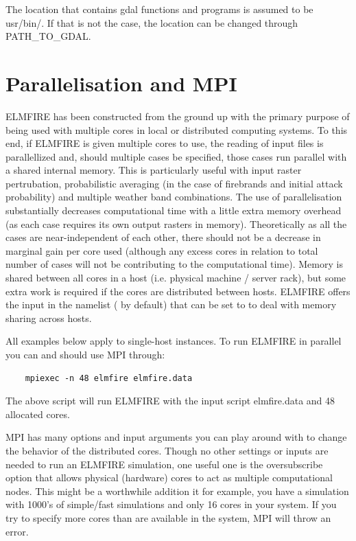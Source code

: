 The location that contains gdal functions and programs is assumed to be usr/bin/. If that is not the case, the location can be changed through PATH\_TO\_GDAL.

\section{Parallelisation and MPI}
\label{mpi}

ELMFIRE has been constructed from the ground up with the primary purpose of being used with multiple cores in local or distributed computing systems. To this end, if ELMFIRE is given multiple cores to use, the reading of input files is parallellized and, should multiple cases be specified, those cases run parallel with a shared internal memory. This is particularly useful with input raster pertrubation, probabilistic averaging (in the case of firebrands and initial attack probability) and multiple weather band combinations. The use of parallelisation substantially decreases computational time with a little extra memory overhead (as each case requires its own output rasters in memory). Theoretically as all the cases are near-independent of each other, there should not be a decrease in marginal gain per core used (although any excess cores in relation to total number of cases will not be contributing to the computational time). Memory is shared between all cores in a host (i.e. physical machine / server rack), but some extra work is required if the cores are distributed between hosts. ELMFIRE offers the  input in the  namelist ( by default) that can be set to  to deal with memory sharing across hosts.

All examples below apply to single-host instances. To run ELMFIRE in parallel you can and should use MPI through:

\begin{verbatim}
    mpiexec -n 48 elmfire elmfire.data
\end{verbatim}

The above script will run ELMFIRE with the input script elmfire.data and 48 allocated cores. 

MPI has many options and input arguments you can play around with to change the behavior of the distributed cores. Though no other settings or inputs are needed to run an ELMFIRE simulation, one useful one is the oversubscribe option that allows physical (hardware) cores to act as multiple computational nodes. This might be a worthwhile addition it for example, you have a simulation with 1000's of simple/fast simulations and only 16 cores in your system. If you try to specify more cores than are available in the system, MPI will throw an error. 

